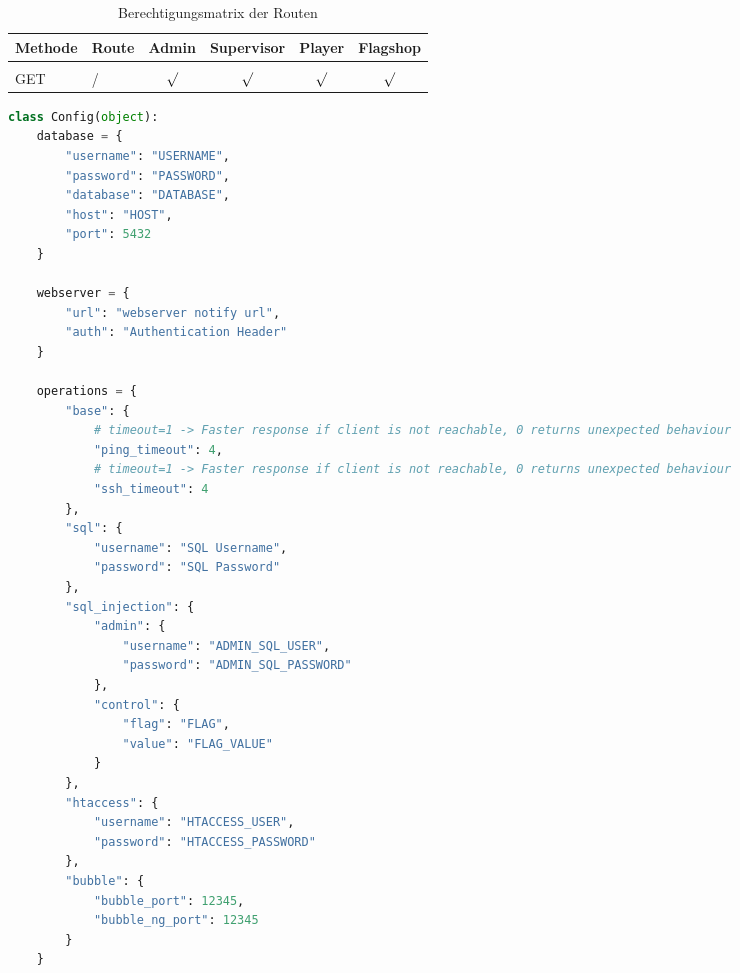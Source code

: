 \begin{table}
	\centering
	\begin{tabular}{l l c c c c}
		Methode & Route	& Admin & Supervisor & Player  & Flagshop \\ [0.5ex]
		\hline &&&&&\\
		GET & /	&  $\surd$ &  $\surd$  &  $\surd$ &  $\surd$ \\
	\end{tabular}
	\caption{Berechtigungsmatrix der Routen}
	\label{table:gis-permission}
\end{table}


\begin{lstlisting}[frame=single, language=python, caption={Config Vorlage Big Brother}, captionpos=b, label={lst:anhang-bigbrother-config-example}]
	class Config(object):
	database = {
		"username": "USERNAME",
		"password": "PASSWORD",
		"database": "DATABASE",
		"host": "HOST",
		"port": 5432
	}
	
	webserver = {
		"url": "webserver notify url",
		"auth": "Authentication Header"
	}
	
	operations = {
		"base": {
			# timeout=1 -> Faster response if client is not reachable, 0 returns unexpected behaviour
			"ping_timeout": 4,
			# timeout=1 -> Faster response if client is not reachable, 0 returns unexpected behaviour
			"ssh_timeout": 4
		},
		"sql": {
			"username": "SQL Username",
			"password": "SQL Password"
		},
		"sql_injection": {
			"admin": {
				"username": "ADMIN_SQL_USER",
				"password": "ADMIN_SQL_PASSWORD"
			},
			"control": {
				"flag": "FLAG",
				"value": "FLAG_VALUE"
			}
		},
		"htaccess": {
			"username": "HTACCESS_USER",
			"password": "HTACCESS_PASSWORD"
		},
		"bubble": {
			"bubble_port": 12345,
			"bubble_ng_port": 12345
		}
	}
\end{lstlisting}

